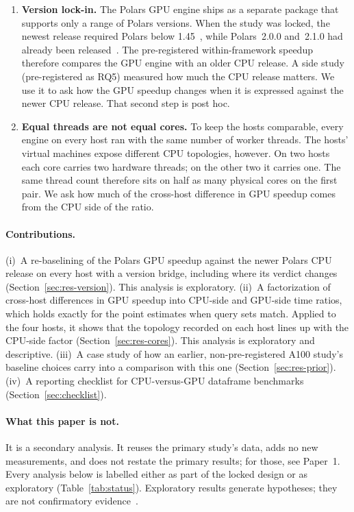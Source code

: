 \documentclass[11pt]{article}
\begin{document}
\begin{enumerate}[leftmargin=*,itemsep=2pt]
  \item \textbf{Version lock-in.} The Polars GPU engine ships as a separate
    package that supports only a range of Polars versions. When the study was
    locked, the newest release required Polars below
    1.45~\citep{pypi_cudfpolars_26102}, while Polars~2.0.0 and~2.1.0 had already
    been released~\citep{pypi_polars}. The pre-registered within-framework
    speedup therefore compares the GPU engine with an older CPU release. A
    side study (pre-registered as RQ5) measured how much the CPU release
    matters. We use it to ask how the GPU speedup changes when it is expressed
    against the newer CPU release. That second step is post hoc.
  \item \textbf{Equal threads are not equal cores.} To keep the hosts
    comparable, every engine on every host ran with the same number of
    worker threads. The hosts' virtual machines expose different CPU
    topologies, however. On two hosts each core carries two hardware threads;
    on the other two it carries one. The same thread count therefore sits on
    half as many physical cores on the first pair. We ask how much of the
    cross-host difference in GPU speedup comes from the CPU side of the ratio.
\end{enumerate}

\paragraph{Contributions.}
(i)~A re-baselining of the Polars GPU speedup against the newer Polars CPU
release on every host with a version bridge, including where its verdict
changes (Section~\ref{sec:res-version}). This analysis is exploratory.
(ii)~A factorization of cross-host differences in GPU speedup into CPU-side and
GPU-side time ratios, which holds exactly for the point estimates when query
sets match. Applied to the four hosts, it shows that the topology recorded on
each host lines up with the CPU-side factor
(Section~\ref{sec:res-cores}). This analysis is exploratory and descriptive.
(iii)~A case study of how an earlier, non-pre-registered A100 study's baseline
choices carry into a comparison with this one (Section~\ref{sec:res-prior}).
(iv)~A reporting checklist for CPU-versus-GPU dataframe benchmarks
(Section~\ref{sec:checklist}).

\paragraph{What this paper is not.} It is a secondary analysis. It reuses the
primary study's data, adds no new measurements, and does not restate the
primary results; for those, see Paper~1. Every analysis below is labelled
either as part of the locked design or as exploratory
(Table~\ref{tab:status}). Exploratory results generate hypotheses; they are
not confirmatory evidence~\citep{nosek2018prereg,gelman2014crisis}.
\end{document}
